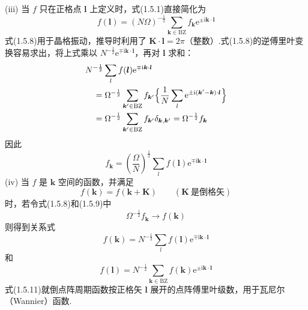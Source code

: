 (iii) 当 $f$ 只在正格点 $\boldsymbol{l}$ 上定义时，式(1.5.1)直接简化为
\begin{equation}
  f(\boldsymbol{l})=(N\Omega)^{-\frac{1}{2}}\sum_{\boldsymbol{k}\in\mathrm{BZ}}f_{\boldsymbol{k}}
  \mathrm{e}^{\pm\mathrm{i}\boldsymbol{k}\cdot\boldsymbol{l}}
\end{equation}
式(1.5.8)用于晶格振动，推导时利用了 $\boldsymbol{K}\cdot\boldsymbol{l}=2\pi$（整数）.式(1.5.8)的逆傅里叶变换容易求出，将上式乘以 $N^{-\frac{1}{2}}\mathrm{e}^{\mp\mathrm{i}\boldsymbol{k}\cdot\boldsymbol{l}}$，再对 $\boldsymbol{l}$ 求和：
\begin{equation*}
\begin{aligned}
  &N^{-\frac{1}{2}}\sum_l f(\boldsymbol{l})\mathrm{e}^{\mp\mathrm{i}\boldsymbol{k}\cdot\boldsymbol{l}}\\
  &\quad=\Omega^{-\frac{1}{2}}\sum_{\boldsymbol{k}'\in\mathrm{BZ}}f_{\boldsymbol{k}'}
  \Bigl\{\frac{1}{N}\sum_l\mathrm{e}^{\pm\mathrm{i}(\boldsymbol{k}'-\boldsymbol{k})\cdot\boldsymbol{l}}\Bigr\}\\
  &\quad=\Omega^{-\frac{1}{2}}\sum_{\boldsymbol{k}'\in\mathrm{BZ}}f_{\boldsymbol{k}'}
  \delta_{\boldsymbol{k},\boldsymbol{k}'}=\Omega^{-\frac{1}{2}}f_{\boldsymbol{k}}
\end{aligned}
\end{equation*}
因此
\begin{equation}
  f_{\boldsymbol{k}}=\left(\frac{\Omega}{N}\right)^{\frac{1}{2}}\sum_l f(\boldsymbol{l})
  \mathrm{e}^{\mp\mathrm{i}\boldsymbol{k}\cdot\boldsymbol{l}}
\end{equation}
(iv) 当 $f$ 是 $\boldsymbol{k}$ 空间的函数，并满足
\begin{equation}
  f(\boldsymbol{k})=f(\boldsymbol{k}+\boldsymbol{K})
  \qquad(\boldsymbol{K}\ \text{是倒格矢})
\end{equation}
时，若令式(1.5.8)和(1.5.9)中
\begin{equation*}
  \Omega^{-\frac{1}{2}}f_{\boldsymbol{k}}\to f(\boldsymbol{k})
\end{equation*}
则得到关系式
\begin{equation}
  f(\boldsymbol{k})=N^{-\frac{1}{2}}\sum_l f(\boldsymbol{l})
  \mathrm{e}^{\mp\mathrm{i}\boldsymbol{k}\cdot\boldsymbol{l}}
\end{equation}
和
\begin{equation}
  f(\boldsymbol{l})=N^{-\frac{1}{2}}\sum_{\boldsymbol{k}\in\mathrm{BZ}}f(\boldsymbol{k})
  \mathrm{e}^{\pm\mathrm{i}\boldsymbol{k}\cdot\boldsymbol{l}}
\end{equation}
式(1.5.11)就倒点阵周期函数按正格矢 $\boldsymbol{l}$ 展开的点阵傅里叶级数，用于瓦尼尔（Wannier）函数.

